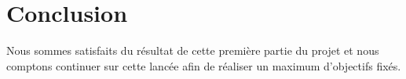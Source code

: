 \section{Conclusion}
Nous sommes satisfaits du résultat de cette première partie du projet et nous comptons continuer sur cette lancée afin de réaliser un maximum d’objectifs fixés.
